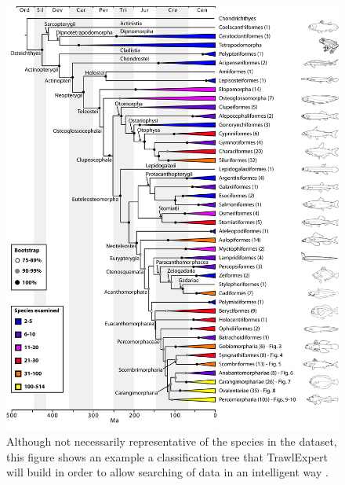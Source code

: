 \documentclass{article}
\begin{document}
\clearpage



\clearpage

\begin{figure}[p]
\centering

\includegraphics[width=15cm]{TreeFig.jpg}

\caption{Although not necessarily representative of the species in the dataset, this figure shows an example a classification tree that TrawlExpert will build in order to allow searching of data in an intelligent way \citep{plosblog2014}.}
\label{fig:Tree}
\end{figure}
\end{document}
